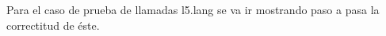 \documentclass[11pt, spanish]{report}
\begin{document}
\begin{itemize}

\end{itemize}

Para el caso de prueba de llamadas l5.lang se va ir mostrando paso a pasa la correctitud de \'este.\\
\end{document}
